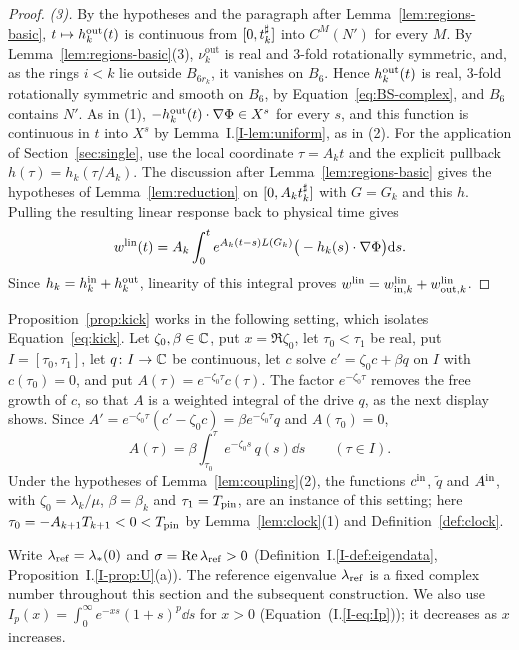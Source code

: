 \begin{proof}
\emph{(3).} By the hypotheses and the paragraph after
Lemma~\ref{lem:regions-basic}, $t\mapsto h^{\mathrm{out}}_k(t)$ is continuous from
$[0,t^\sharp_k]$ into $C^M(N')$ for every $M$. By Lemma~\ref{lem:regions-basic}(3),
$\nu^{\mathrm{out}}_k$ is real and $3$-fold rotationally symmetric, and, as the
rings $i<k$ lie outside $B_{6r_k}$, it vanishes on $B_6$. Hence
$h^{\mathrm{out}}_k(t)$ is real, $3$-fold rotationally symmetric and smooth on $B_6$, by
Equation~\eqref{eq:BS-complex}, and $B_6$ contains $N'$. As in (1),
$-h^{\mathrm{out}}_k(t)\cdot\nabla\Phi\in X^s$ for every $s$, and this function is
continuous in $t$ into $X^s$ by Lemma~I.\ref{I-lem:uniform}, as in (2).
For the application of Section~\ref{sec:single}, use the local coordinate
$\tau=A_kt$ and the explicit pullback $h(\tau)=h_k(\tau/A_k)$.
The discussion after Lemma~\ref{lem:regions-basic} gives the hypotheses of
Lemma~\ref{lem:reduction} on $[0,A_kt^\sharp_k]$ with $G=G_k$ and this $h$.
Pulling the resulting linear response back to physical time gives
\[
w^{\mathrm{lin}}(t)=A_k\int_0^t e^{A_k(t-s)L(G_k)}
\big(-h_k(s)\cdot\nabla\Phi\big)\dd s.
\]
Since $h_k=h^{\mathrm{in}}_k+h^{\mathrm{out}}_k$, linearity of this integral proves
$w^{\mathrm{lin}}=w^{\mathrm{lin}}_{\mathrm{in},k}+w^{\mathrm{lin}}_{\mathrm{out},k}$.
\end{proof}

Proposition~\ref{prop:kick} works in the following setting, which isolates
Equation~\eqref{eq:kick}. Let $\zeta_0,\beta\in\mathbb{C}$, put $x=\Re\zeta_0$, let
$\tau_0<\tau_1$ be real, put $I=[\tau_0,\tau_1]$, let
$q\colon I\to\mathbb{C}$ be continuous, let $c$ solve $c'=\zeta_0c+\beta q$ on $I$ with
$c(\tau_0)=0$, and put $A(\tau)=e^{-\zeta_0\tau}c(\tau)$. The factor
$e^{-\zeta_0\tau}$ removes the free growth of $c$, so that $A$ is a weighted
integral of the drive $q$, as the next display shows. Since
$A'=e^{-\zeta_0\tau}(c'-\zeta_0c)=\beta e^{-\zeta_0\tau}q$ and $A(\tau_0)=0$,
\begin{equation}
\label{eq:kick-A}
A(\tau)=\beta\int_{\tau_0}^\tau e^{-\zeta_0s}\,q(s)\dd s\qquad(\tau\in I).
\end{equation}
Under the hypotheses of Lemma~\ref{lem:coupling}\textup{(2)}, the functions
$c^{\mathrm{in}}$, $\tilde q$ and $A^{\mathrm{in}}$, with $\zeta_0=\lambda_k/\mu$, $\beta=\beta_k$ and
$\tau_1=T_{\mathrm{pin}}$, are an instance of this setting; here
$\tau_0=-A_{k+1}T_{k+1}<0<T_{\mathrm{pin}}$ by Lemma~\ref{lem:clock}(1) and
Definition~\ref{def:clock}.

Write $\lambda_{\mathrm{ref}}=\lambda_*(0)$ and $\sigma=\Re\lambda_{\mathrm{ref}}>0$
(Definition~I.\ref{I-def:eigendata}, Proposition~I.\ref{I-prop:U}(a)).
The reference eigenvalue $\lambda_{\mathrm{ref}}$ is a fixed complex number throughout this
section and the subsequent construction. We also use
$I_p(x)=\int_0^\infty e^{-xs}(1+s)^p\dd s$ for $x>0$
(Equation~(I.\ref{I-eq:Ip})); it decreases as $x$ increases.

